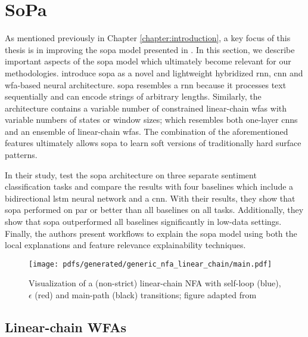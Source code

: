\section{SoPa}

\label{section:sopa}

As mentioned previously in Chapter \ref{chapter:introduction}, a key focus of
this thesis is in improving the \ac{sopa} model
presented in \citet{schwartz2018sopa}. In this section, we describe important
aspects of the \ac{sopa} model which ultimately become relevant for our
methodologies. \citet{schwartz2018sopa} introduce \ac{sopa} as a novel and
lightweight hybridized \ac{rnn}, \ac{cnn} and \ac{wfa}-based neural architecture. \ac{sopa}
resembles a \ac{rnn} because it processes text sequentially and can encode strings of
arbitrary lengths. Similarly, the architecture contains a variable number of
constrained linear-chain \ac{wfas} with variable numbers of states or window sizes;
which resembles both one-layer \ac{cnn}s and an ensemble of linear-chain \ac{wfas}. The
combination of the aforementioned features ultimately allows \ac{sopa} to learn soft
versions of traditionally hard surface patterns.

In their study, \citet{schwartz2018sopa} test the \ac{sopa} architecture on three
separate sentiment classification tasks and compare the results with four
baselines which include a bidirectional \ac{lstm} neural network and a \ac{cnn}.
With their results, they show that \ac{sopa} performed on par or better than all
baselines on all tasks. Additionally, they show that \ac{sopa} outperformed all
baselines significantly in low-data settings. Finally, the authors present
workflows to explain the \ac{sopa} model using both the local explanations and
feature relevance explainability techniques.

\begin{figure}[t]
  \centering
  \texttt{[image: pdfs/generated/generic\_nfa\_linear\_chain/main.pdf]}
  \caption{Visualization of a (non-strict) linear-chain NFA with
    self-loop (blue), $\epsilon$ (red) and main-path (black) transitions; figure
    adapted from \citet{schwartz2018sopa}}
  \label{fig:fa}
\end{figure}

\subsection{Linear-chain WFAs}

\label{section:sopa_lc_wfa}

